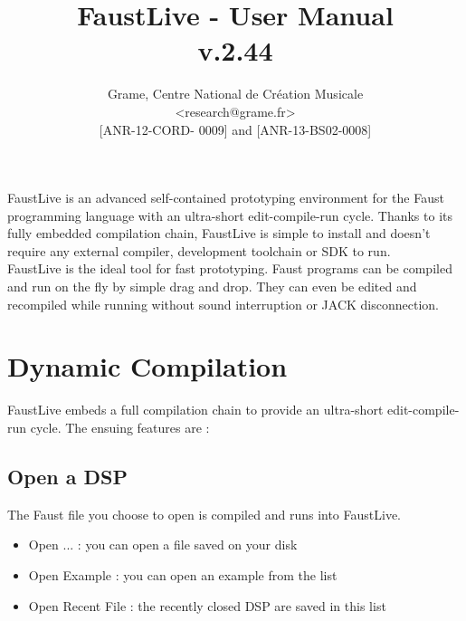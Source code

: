 \documentclass[a4paper]{article}
\begin{document}
\title{FaustLive - User Manual \\ v.2.44}

\author{Grame, Centre National de Création Musicale\\
{\small <research@grame.fr>} \\
\vspace{2mm}
[ANR-12-CORD- 0009] and [ANR-13-BS02-0008]
}

\maketitle


\vspace{\fill}

FaustLive is an advanced self-contained prototyping environment for the Faust programming language with an ultra-short edit-compile-run cycle. Thanks to its fully embedded compilation chain, FaustLive is simple to install and doesn't require any external compiler, development toolchain or SDK to run. \\

FaustLive is the ideal tool for fast prototyping. Faust programs can be compiled and run on the fly by simple drag and drop. They can even be edited and recompiled while running without sound interruption or JACK disconnection.
\vspace{\fill}
\newpage
\tableofcontents

\newpage
\section{Dynamic Compilation}
FaustLive embeds a full compilation chain to provide an ultra-short edit-compile-run cycle.
The ensuing features are :

\subsection{Open a DSP}
The Faust file you choose to open is compiled and runs into FaustLive.
\begin{itemize}
\item Open ... : you can open a file saved on your disk
\item Open Example : you can open an example from the list
\item Open Recent File : the recently closed DSP are saved in this list
\end{itemize}
\end{document}
